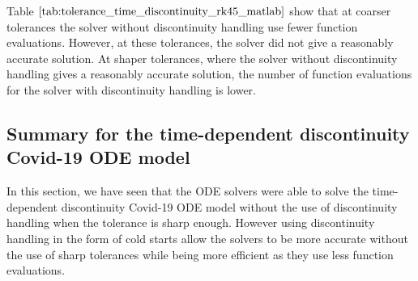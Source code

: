 Table $\ref{tab:tolerance_time_discontinuity_rk45_matlab}$ show that at coarser tolerances the solver without discontinuity handling use fewer function evaluations. However, at these tolerances, the solver did not give a reasonably accurate solution. At shaper tolerances, where the solver without discontinuity handling gives a reasonably accurate solution, the number of function evaluations for the solver with discontinuity handling is lower.

\subsection{Summary for the time-dependent discontinuity Covid-19 ODE model}
In this section, we have seen that the ODE solvers were able to solve the time-dependent discontinuity Covid-19 ODE model without the use of discontinuity handling when the tolerance is sharp enough. However using discontinuity handling in the form of cold starts allow the solvers to be more accurate without the use of sharp tolerances while being more efficient as they use less function evaluations.